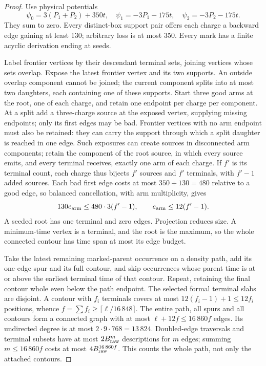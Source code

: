 \begin{proof}
Use physical potentials
\[
 \psi_0=3(P_1+P_2)+350t,\quad
 \psi_1=-3P_1-175t,\quad \psi_2=-3P_2-175t.
\]
They sum to zero. Every distinct-box support pair offers each charge a
backward edge gaining at least 130; arbitrary loss is at most 350.
Every mark has a finite acyclic derivation ending at seeds.

Label frontier vertices by their descendant terminal sets, joining
vertices whose sets overlap. Expose the latest frontier vertex and its
two supports. An outside overlap component cannot be joined; the current
component splits into at most two daughters, each containing one of
these supports. Start three good arms at the root, one of each charge,
and retain one endpoint per charge per component. At a split add a
three-charge source at the exposed vertex, supplying missing endpoints;
only its first edges may be bad. Frontier vertices with no arm endpoint
must also be retained: they can carry the support through which a
split daughter is reached in one edge. Such exposures can create sources
in disconnected arm components; retain the component of the root source,
in which every source emits, and every terminal receives, exactly one
arm of each charge. If \(f'\) is its terminal count, each charge thus
bijects \(f'\) sources and \(f'\) terminals, with \(f'-1\) added sources.
Each bad first edge costs at most \(350+130=480\) relative to a good
edge, so balanced cancellation, with arm multiplicity, gives
\[
 130e_{\rm arm}\le480\cdot3(f'-1),\qquad e_{\rm arm}\le12(f'-1).
\]
A seeded root has one terminal and zero edges. Projection reduces size.
A minimum-time vertex is a terminal, and the root is the maximum, so the
whole connected contour has time span at most its edge budget.

Take the latest remaining marked-parent occurrence on a density path,
add its one-edge spur and its full contour, and skip occurrences whose
parent time is at or above the earliest terminal time of that contour.
Repeat, retaining the final contour whole even below the path endpoint.
The selected formal terminal slabs are disjoint. A contour with \(f_i\)
terminals covers at most \(12(f_i-1)+1\le12f_i\) positions, whence
\(f=\sum f_i\ge\lceil\ell/16\,848\rceil\). The entire path, all spurs
and all contours form a connected graph with at most
\(\ell+12f\le16\,860f\) edges. Its undirected degree is at most
\(2\cdot9\cdot768=13\,824\). Doubled-edge traversals and terminal subsets
have at most \(2B_{\rm raw}^m\) descriptions for \(m\) edges; summing
\(m\le16\,860f\) costs at most \(4B_{\rm raw}^{16\,860f}\). This counts
the whole path, not only the attached contours.


\end{proof}
